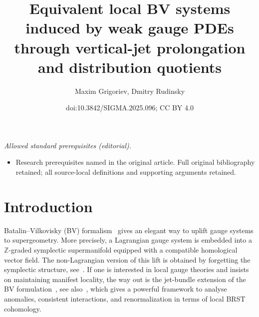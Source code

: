 \documentclass[10pt,a4paper]{amsart}
\title{Equivalent local BV systems induced by weak gauge PDEs through vertical-jet prolongation and distribution quotients}
\author{Maxim Grigoriev, Dmitry Rudinsky}
\date{doi:10.3842/SIGMA.2025.096; CC BY 4.0}
\numberwithin{equation}{section}
\theoremstyle{definition}
\newcommand{\fZ}{\mathbb{Z}}
\begin{document}
\maketitle
\noindent\textit{Allowed standard prerequisites (editorial).}\begin{itemize}
\item Research prerequisites named in the original article. Full original bibliography retained; all source-local definitions and supporting arguments retained.
\end{itemize}\medskip
\section{Introduction}

Batalin--Vilkovisky (BV) formalism~\cite{Batalin:1981jr,Batalin:1983wj} gives an elegant way to uplift gauge systems to supergeometry. More precisely, a Lagrangian gauge system is embedded into a $\fZ$-graded symplectic supermanifold equipped with a compatible homological vector field. The non-Lagrangian version of this lift is obtained by forgetting the symplectic structure, see~\cite{Barnich:2004cr,Kazinski:2005eb,Sharapov:2016sgx}. If one is interested in local gauge theories and insists on maintaining manifest locality, the way out is the jet-bundle extension of the BV formulation~\cite{Barnich:1995ap, Barnich:1995db}, see also~\cite{Barnich:2000zw,Henneaux:1990rx,Piguet:1995er}, which gives a powerful framework to analyse anomalies, consistent interactions, and renormalization in terms of local BRST cohomology.
\end{document}
